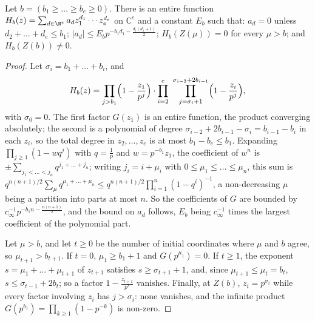 \begin{lemma}[Wood, 2017]\label{lem:woodfunctions}
Let $b=(b_1\ge\dots\ge b_e\ge0)$. There is an entire function $H_b(z)=\sum_{d\in\N^e}a_dz_1^{d_1}\cdots z_e^{d_e}$ on $\mathbb C^e$ and a constant $E_b$ such that: $a_d=0$ unless $d_2+\dots+d_e\le b_1$; $|a_d|\le E_bp^{-b_1d_1-\frac{d_1(d_1+1)}2}$; $H_b(Z(\mu))=0$ for every $\mu>b$; and $H_b(Z(b))\ne0$.
\end{lemma}
\begin{proof}
Let $\sigma_i=b_1+\dots+b_i$, and
\[
H_b(z)=\prod_{j>b_1}\Bigl(1-\frac{z_1}{p^j}\Bigr)\cdot\prod_{i=2}^e\ \prod_{j=\sigma_i+1}^{\sigma_{i-2}+2b_{i-1}}\Bigl(1-\frac{z_i}{p^j}\Bigr),
\]
with $\sigma_0=0$. The first factor $G(z_1)$ is an entire function, the product converging absolutely; the second is a polynomial of degree $\sigma_{i-2}+2b_{i-1}-\sigma_i=b_{i-1}-b_i$ in each $z_i$, so the total degree in $z_2,\dots,z_e$ is at most $b_1-b_e\le b_1$. Expanding $\prod_{j\ge1}(1-wq^j)$ with $q=\frac1p$ and $w=p^{-b_1}z_1$, the coefficient of $w^n$ is $\pm\sum_{j_1<\dots<j_n}q^{j_1+\dots+j_n}$; writing $j_i=i+\mu_i$ with $0\le\mu_1\le\dots\le\mu_n$, this sum is $q^{n(n+1)/2}\sum_\mu q^{\mu_1+\dots+\mu_n}\le q^{n(n+1)/2}\prod_{i=1}^n(1-q^i)^{-1}$, a non-decreasing $\mu$ being a partition into parts at most $n$. So the coefficients of $G$ are bounded by $c_\infty^{-1}p^{-b_1n-\frac{n(n+1)}2}$, and the bound on $a_d$ follows, $E_b$ being $c_\infty^{-1}$ times the largest coefficient of the polynomial part.

Let $\mu>b$, and let $t\ge0$ be the number of initial coordinates where $\mu$ and $b$ agree, so $\mu_{t+1}>b_{t+1}$. If $t=0$, $\mu_1\ge b_1+1$ and $G(p^{\mu_1})=0$. If $t\ge1$, the exponent $s=\mu_1+\dots+\mu_{t+1}$ of $z_{t+1}$ satisfies $s\ge\sigma_{t+1}+1$, and, since $\mu_{t+1}\le\mu_t=b_t$, $s\le\sigma_{t-1}+2b_t$; so a factor $1-\frac{z_{t+1}}{p^s}$ vanishes. Finally, at $Z(b)$, $z_i=p^{\sigma_i}$ while every factor involving $z_i$ has $j>\sigma_i$: none vanishes, and the infinite product $G(p^{b_1})=\prod_{k\ge1}(1-p^{-k})$ is non-zero.
\end{proof}

